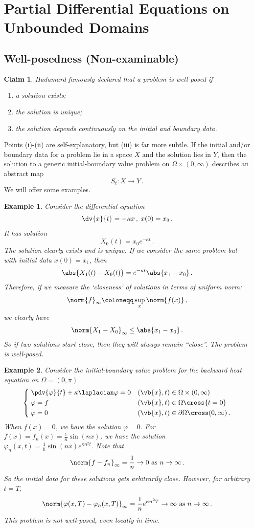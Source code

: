 \documentclass{article}
\theoremstyle{plain}\theoremheaderfont{\normalfont\itshape}\theorembodyfont{\rmfamily}\theoremseparator{.}\newtheorem*{rem}{Remark}\newtheorem*{ex}{Example}\newtheorem*{proof}{Proof}\newtheorem*{altp}{Alternative proof}
\theoremstyle{plain}\theoremheaderfont{\normalfont\bfseries}\theorembodyfont{\rmfamily}\theoremseparator{.}\newtheorem{thm}{Theorem}[section]\newtheorem{lem}[thm]{Lemma}\newtheorem{prop}[thm]{Proposition}\newtheorem*{cor}{Corollary}\newtheorem{defn}[thm]{Definition}\newtheorem{clm}[thm]{Claim}\newtheorem{clminproof}{Claim}
\theoremstyle{break}\theoremheaderfont{\normalfont\itshape}\theorembodyfont{\rmfamily}\theoremseparator{.\medskip}\newtheorem*{proofskip}{Proof}\newtheorem*{exs}{Examples}\newtheorem*{rems}{Remarks}
\theoremstyle{break}\theoremheaderfont{\normalfont\bfseries}\theorembodyfont{\rmfamily}\theoremseparator{.\medskip}\newtheorem{lemskip}[thm]{Lemma}\newtheorem{defnskip}[thm]{Definition}\newtheorem{propskip}[thm]{Proposition}\newtheorem{thmskip}[thm]{Theorem}
\numberwithin{equation}{section}
\begin{document}
	\newpage

	\section{Partial Differential Equations on Unbounded Domains}
	\subsection{Well-posedness (Non-examinable)}
	\begin{clm}
		Hadamard famously declared that a problem is well-posed if
		\begin{enumerate}[topsep=0pt]
			\item a solution exists;
			\item the solution is unique;
			\item the solution depends continuously on the initial and boundary data.
		\end{enumerate}
	\end{clm}
	Points (i)-(ii) are self-explanatory, but (iii) is far more subtle. If the initial and/or boundary data for a problem lie in a space \(X\) and the solution lies in \(Y\), then the solution to a generic initial-boundary value problem on \(\Omega\times(0,\infty)\) describes an abstract map
	\[S_t:X\to Y\,.\]
	We will offer some examples.
	\begin{ex}
		Consider the differential equation
		\[\dv{x}{t}=-\kappa x\,,\;x(0)=x_0\,.\]
		It has solution
		\[X_0(t)=x_0e^{-\kappa t}\,.\]
		The solution clearly exists and is unique. If we consider the same problem but with initial data \(x(0)=x_1\), then
		\[\abs{X_1(t)-X_0(t)}=e^{-\kappa t}\abs{x_1-x_0}\,.\]
		Therefore, if we measure the `closeness' of solutions in terms of \textit{uniform norm}:
		\[\norm{f}_\infty\coloneqq\sup_{x}\norm{f(x)}\,,\]
		we clearly have
		\[\norm{X_1-X_0}_\infty\le\abs{x_1-x_0}\,.\]
		So if two solutions start close, then they will always remain “close”. The problem is well-posed.
	\end{ex}
	\begin{ex}
		Consider the initial-boundary value problem for the backward heat equation on \(\Omega=(0,\pi)\).
		\[\left\{\begin{aligned}
			& \;\pdv{\varphi}{t}+\kappa\laplacian\varphi=0 && (\vb{x},t)\in\Omega\times(0,\infty)\\
			& \;\varphi=f && (\vb{x},t)\in\Omega\cross\{t=0\}\\
			& \;\varphi=0 && (\vb{x},t)\in\partial\Omega\cross(0,\infty)\,.
		\end{aligned}\right.\]
		When \(f(x)=0\), we have the solution \(\varphi=0\). For \(f(x)=f_n(x)=\frac{1}{n}\sin(nx)\), we have the solution \(\varphi_n(x,t)=\frac{1}{n}\sin(nx)e^{\kappa n^2t}\). Note that
		\[\norm{f-f_n}_\infty=\frac{1}{n}\to 0\text{ as }n\to\infty\,.\]
		So the initial data for these solutions gets arbitrarily close. However, for arbitrary \(t=T\),
		\[\norm{\varphi(x,T)-\varphi_n(x,T)}_\infty=\frac{1}{n}e^{\kappa n^2T}\to\infty\text{ as }n\to\infty\,.\]
		This problem is not well-posed, even locally in time.
	\end{ex}
\end{document}
